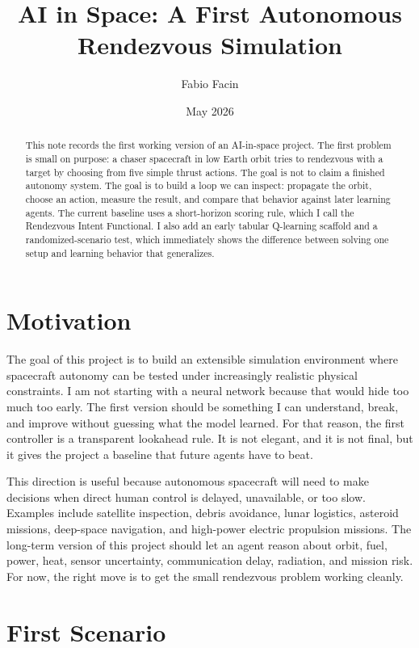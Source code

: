 \documentclass[11pt]{article}
\title{AI in Space: A First Autonomous Rendezvous Simulation}
\author{Fabio Facin}
\date{May 2026}
\begin{document}
\maketitle

\begin{abstract}
This note records the first working version of an AI-in-space project.
The first problem is small on purpose: a chaser spacecraft in low Earth orbit tries to rendezvous with a target by choosing from five simple thrust actions.
The goal is not to claim a finished autonomy system.
The goal is to build a loop we can inspect: propagate the orbit, choose an action, measure the result, and compare that behavior against later learning agents.
The current baseline uses a short-horizon scoring rule, which I call the Rendezvous Intent Functional.
I also add an early tabular Q-learning scaffold and a randomized-scenario test, which immediately shows the difference between solving one setup and learning behavior that generalizes.
\end{abstract}

\section{Motivation}

The goal of this project is to build an extensible simulation environment where spacecraft autonomy can be tested under increasingly realistic physical constraints.
I am not starting with a neural network because that would hide too much too early.
The first version should be something I can understand, break, and improve without guessing what the model learned.
For that reason, the first controller is a transparent lookahead rule.
It is not elegant, and it is not final, but it gives the project a baseline that future agents have to beat.

This direction is useful because autonomous spacecraft will need to make decisions when direct human control is delayed, unavailable, or too slow.
Examples include satellite inspection, debris avoidance, lunar logistics, asteroid missions, deep-space navigation, and high-power electric propulsion missions.
The long-term version of this project should let an agent reason about orbit, fuel, power, heat, sensor uncertainty, communication delay, radiation, and mission risk.
For now, the right move is to get the small rendezvous problem working cleanly.

\section{First Scenario}
\end{document}
